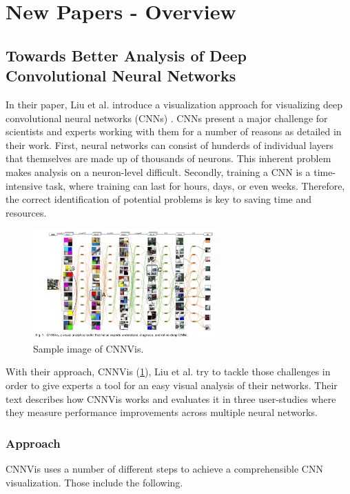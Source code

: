 \documentclass{acmsiggraph}               %
\begin{document}
\newpage

\section{New Papers - Overview}
\subsection{Towards Better Analysis of Deep Convolutional Neural Networks}
In their paper, Liu et al. introduce a  visualization approach for visualizing deep convolutional neural networks (CNNs) \cite{Liu2016}. CNNs present a major challenge for scientists and experts working with them for a number of reasons as detailed in their work. First, neural networks can consist of hunderds of individual layers that themselves are made up of thousands of neurons. This inherent problem makes analysis on a neuron-level difficult. Secondly, training a CNN is a time-intensive task, where training can last for hours, days, or even weeks. Therefore, the correct identification of potential problems is key to saving time and resources.\\

\begin{figure}
  \centering
  \includegraphics[width=2.75in]{cnnvis}
  \caption{Sample image of CNNVis. \protect\cite{Liu2016}}
  \label{fig:cnnvis}
\end{figure}

With their approach, CNNVis (\ref{fig:cnnvis}), Liu et al. try to tackle those challenges in order to give experts a tool for an easy visual analysis of their networks. Their text describes how CNNVis works and evaluates it in three user-studies where they measure performance improvements across multiple neural networks.\\

\subsubsection{Approach}
CNNVis uses a number of different steps to achieve a comprehensible CNN visualization. Those include the following.
\end{document}
